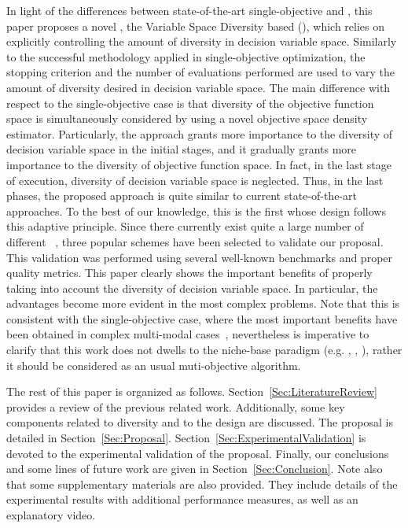 In light of the differences between state-of-the-art single-objective \EAS{} and \MOEAS{}, 
this paper proposes a novel \MOEA{}, the Variable Space Diversity based \MOEA{} (\VSDMOEA{}), 
which relies on explicitly controlling the amount of diversity in decision variable space.
%
Similarly to the successful methodology applied in single-objective optimization, the stopping criterion and the 
number of evaluations performed are used to vary the amount of diversity desired in decision variable space.
%
The main difference with respect to the single-objective case is that diversity of the objective function space 
is simultaneously considered by using a novel objective space density estimator.
%
Particularly, the approach grants more importance to the diversity of decision variable space in the initial stages, and 
it gradually grants more importance to the diversity of objective function space.
%
In fact, in the last stage of execution, diversity of decision variable space is neglected. Thus, 
in the last phases, the proposed approach is quite similar to current state-of-the-art approaches.
%
To the best of our knowledge, this is the first \MOEA{} whose design follows this adaptive principle.
%
Since there currently exist quite a large number of different \MOEAS{}~\citep{Joel:MOEA_APPLICATIONS_BOOK_KCTAN}, 
three popular schemes have been selected to validate our proposal.
%
This validation was performed using several well-known benchmarks and proper quality metrics.
%
This paper clearly shows the important benefits of properly taking into account the diversity of decision variable space.
%
In particular, the advantages become more evident in the most complex problems.
%
Note that this is consistent with the single-objective case, where the most important benefits have been obtained
in complex multi-modal cases~\citep{Segura:17}, nevertheless is imperative to clarify that this work does not dwells to the niche-base paradigm (e.g. \cite{liang2016multimodal}, \cite{deb2005omni}, \cite{li2016seeking}), 
rather it should be considered as an usual muti-objective algorithm.

The rest of this paper is organized as follows. 
%
Section~\ref{Sec:LiteratureReview} provides a review of the previous related work.
%
Additionally, some key components related to diversity and to the \VSDMOEA{} design are discussed.
%
The \VSDMOEA{} proposal is detailed in Section~\ref{Sec:Proposal}.
%
Section~\ref{Sec:ExperimentalValidation} is devoted to the experimental validation of the proposal.
%
Finally, our conclusions and some lines of future work are given in Section~\ref{Sec:Conclusion}.
%
Note also that some supplementary materials are also provided.
%
They include details of the experimental results with additional performance measures, 
as well as an explanatory video.
